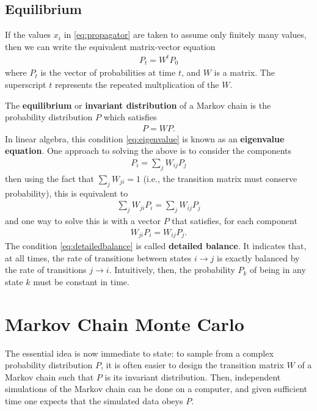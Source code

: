 \documentclass[11pt]{article}
\begin{document}
\subsection{Equilibrium}
\label{sec:orgc1683af}
If the values \(x_{i}\) in \eqref{eq:propagator} are taken to assume only
finitely many values, then we can write the equivalent matrix-vector equation
\begin{align*}
P_{t} = W^{t} P_{0}
\end{align*}
where \(P_{t}\) is the vector of probabilities at time \(t\), and \(W\) is a
matrix. The superscript \(t\) represents the repeated multplication of the \(W\).

The \textbf{equilibrium} or \textbf{invariant distribution} of a Markov chain is the
probability distribution \(P\) which satisfies
\begin{align}
\label{eq:eigenvalue}
P = WP.
\end{align}
In linear algebra, this condition \eqref{eq:eigenvalue} is known as an \textbf{eigenvalue equation}. One
approach to solving the above is to consider the components
\begin{align*}
P_{i} = \sum_{j} W_{ij} P_{j}
\end{align*}
then using the fact that \(\sum_{j} W_{ji} = 1\) (i.e., the transition matrix
must conserve probability), this is equivalent to
\begin{align*}
\sum_{j} W_{ji} P_{i} = \sum_{j} W_{ij}P_{j}
\end{align*}
and one way to solve this is with a vector \(P\) that satisfies, for each component
\begin{align}
\label{eq:detailedbalance}
W_{ji}P_{i} = W_{ij}P_{j}.
\end{align}
The condition \eqref{eq:detailedbalance} is called \textbf{detailed balance}. It
indicates that, at all times, the rate of transitions between states \(i \to j\)
is exactly balanced by the rate of transitions \(j \to i\). Intuitively, then,
the probability \(P_{k}\) of being in any state \(k\) must be constant in time.
\section{Markov Chain Monte Carlo}
\label{sec:orga6c97fe}
The essential idea is now immediate to state: to sample from a complex
probability distribution \(P\), it is often easier to design the transition
matrix \(W\) of a Markov chain such that \(P\) is its invariant distribution.
Then, independent simulations of the Markov chain can be done on a computer, and
given sufficient time one expects that the simulated data obeys \(P\).
\end{document}
